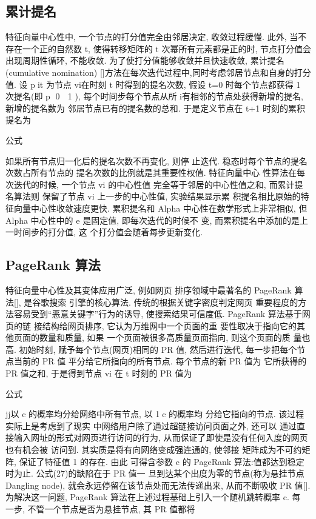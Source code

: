 \subsection{累计提名}
特征向量中心性中, 一个节点的打分值完全由邻居决定, 收敛过程缓慢. 此外, 当不存在一个正的自然数 t, 使得转移矩阵的 t 次幂所有元素都是正的时, 节点打分值会出现周期性循环, 不能收敛. 为了使打分值能够收敛并且快速收敛, 累计提名(cumulative nomination) []方法在每次迭代过程中,同时考虑邻居节点和自身的打分值. 设 pit 为节点 vi在时刻 t 时得到的提名次数, 假设 t=0 时每个节点都获得 1 次提名(即 p 0  1 ), 每个时间步每个节点从所 i有相邻的节点处获得新增的提名, 新增的提名数为 邻居节点已有的提名数的总和. 于是定义节点在 t+1 时刻的累积提名为

			公式

			如果所有节点归一化后的提名次数不再变化, 则停 止迭代. 稳态时每个节点的提名次数占所有节点的 提名次数的比例就是其重要性权值. 特征向量中心 性算法在每次迭代的时候, 一个节点 vi 的中心性值 完全等于邻居的中心性值之和, 而累计提名算法则 保留了节点 vi 上一步的中心性值, 实验结果显示累 积提名相比原始的特征向量中心性收敛速度更快. 累积提名和 Alpha 中心性在数学形式上非常相似, 但 Alpha 中心性中的 e 是固定值, 即每次迭代的时候不 变, 而累积提名中添加的是上一时间步的打分值, 这 个打分值会随着每步更新变化.
\subsection{PageRank 算法}
特征向量中心性及其变体应用广泛, 例如网页 排序领域中最著名的 PageRank 算法[], 是谷歌搜索 引擎的核心算法. 传统的根据关键字密度判定网页 重要程度的方法容易受到“恶意关键字”行为的诱导, 使搜索结果可信度低. PageRank 算法基于网页的链 接结构给网页排序, 它认为万维网中一个页面的重 要性取决于指向它的其他页面的数量和质量, 如果 一个页面被很多高质量页面指向, 则这个页面的质 量也高. 初始时刻, 赋予每个节点(网页)相同的 PR 值, 然后进行迭代, 每一步把每个节点当前的 PR 值 平分给它所指向的所有节点. 每个节点的新 PR 值为 它所获得的 PR 值之和, 于是得到节点 vi 在 t 时刻的 PR 值为

			公式

			jj以 c 的概率均分给网络中所有节点, 以 1c 的概率均 分给它指向的节点. 该过程实际上是考虑到了现实 中网络用户除了通过超链接访问页面之外, 还可以 通过直接输入网址的形式对网页进行访问的行为, 从而保证了即使是没有任何入度的网页也有机会被 访问到. 其实质是将有向网络变成强连通的, 使邻接 矩阵成为不可约矩阵, 保证了特征值 1 的存在. 由此 可得含参数 c 的 PageRank 算法:值都达到稳定时为止. 公式(27)的缺陷在于 PR 值一 旦到达某个出度为零的节点(称为悬挂节点 Dangling node), 就会永远停留在该节点处而无法传递出来, 从而不断吸收 PR 值[]. 为解决这一问题, PageRank 算法在上述过程基础上引入一个随机跳转概率 c. 每 一步, 不管一个节点是否为悬挂节点, 其 PR 值都将

